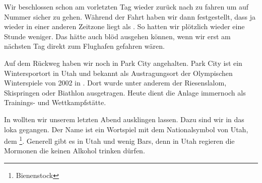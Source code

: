 Wir beschlossen schon am vorletzten Tag wieder zurück nach  zu fahren um auf Nummer sicher zu gehen.
Während der Fahrt haben wir dann festgestellt, dass  ja wieder in einer anderen Zeitzone liegt als .
So hatten wir plötzlich wieder eine Stunde weniger.
Das hätte auch blöd ausgehen können, wenn wir erst am nächsten Tag direkt zum Flughafen gefahren wären.

Auf dem Rückweg haben wir noch in Park City angehalten.
Park City ist ein Wintersportort in Utah und bekannt als Austragungsort der Olympischen Winterspiele von 2002 in .
Dort wurde unter anderem der Riesenslalom, Skispringen oder Biathlon ausgetragen.
Heute dient die Anlage immernoch als Trainings- und Wettkampfstätte.

In  wollten wir unserem letzten Abend ausklingen lassen.
Dazu sind wir in das loka  gegangen.
Der Name ist ein Wortspiel mit dem Nationalsymbol von Utah, dem \footnote{Bienenstock}.
Generell gibt es in Utah und  wenig Bars, denn in Utah regieren die Mormonen die keinen Alkohol trinken dürfen.
